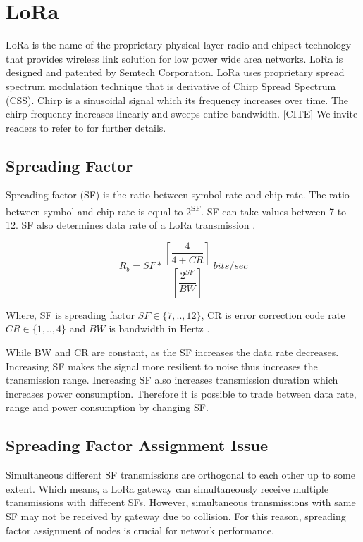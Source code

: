 \documentclass[conference]{IEEEtran}
\begin{document}
\section{LoRa}
\par LoRa is the name of the proprietary physical layer radio and chipset technology that provides wireless link solution for low power wide area networks. LoRa is designed and patented by Semtech Corporation. LoRa uses proprietary spread spectrum modulation technique that is derivative of Chirp Spread Spectrum (CSS). Chirp is a sinusoidal signal which its  frequency increases over time. The chirp frequency increases linearly and sweeps entire bandwidth. [CITE] We invite readers to refer to \cite{AN1200.22} for further details.

\subsection{Spreading Factor}
\par Spreading factor (SF) is the ratio between symbol rate and chip rate. The ratio between symbol and chip rate is equal to $2$\textsuperscript{SF}. SF can take values between 7 to 12. SF also determines data rate of a LoRa transmission \cite{AN1200.22}.

\begin{equation} \label{eq:bit_rate_sf}
R_{b} = SF * \dfrac{\left[ \dfrac{4}{4+CR} \right] }{ \left[ \dfrac{2^{SF}}{BW} \right]} \ bits/sec
\end{equation}

Where, SF is spreading factor $SF \in \{7,..,12\}$, CR is error correction code rate $CR \in \{1,..,4\}$ and $BW$ is bandwidth in Hertz \cite{AN1200.22}.

\par While BW and CR are constant, as the SF increases the data rate decreases. Increasing SF makes the signal more resilient to noise thus increases the transmission range. Increasing SF also increases transmission duration which increases power consumption. Therefore it is possible to trade between data rate, range and power consumption by  changing SF.

\subsection{Spreading Factor Assignment Issue}
\par Simultaneous different SF transmissions are orthogonal to each other up to some extent. Which means, a LoRa gateway can simultaneously receive multiple transmissions with different SFs. However, simultaneous transmissions with same SF may not be received by gateway due to collision. For this reason, spreading factor assignment of nodes is crucial for network performance.
\end{document}
